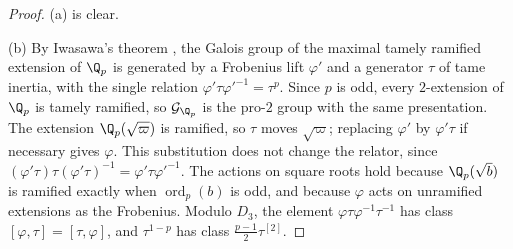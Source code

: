 \begin{proof}
(a) is clear.

(b) By Iwasawa's theorem \cite[Theorem~7.5.3]{NeukirchSchmidtWingberg2008},
the Galois group of the maximal tamely ramified extension of $\Q_p$ is
generated by a Frobenius lift $\varphi'$ and a generator $\tau$ of tame
inertia, with the single relation $\varphi'\tau\varphi'^{-1}=\tau^p$. Since
$p$ is odd,
every $2$-extension of $\Q_p$ is tamely ramified, so $\mathcal G_{\Q_p}$ is
the pro-$2$ group with the same presentation. The extension
$\Q_p(\sqrt\varpi)$ is ramified, so $\tau$ moves $\sqrt\varpi$; replacing
$\varphi'$ by $\varphi'\tau$ if necessary gives $\varphi$. This substitution
does not change the relator, since
$(\varphi'\tau)\tau(\varphi'\tau)^{-1}=\varphi'\tau\varphi'^{-1}$.
The actions on square roots hold because $\Q_p(\sqrt b)$ is ramified exactly
when $\operatorname{ord}_p(b)$ is odd, and because $\varphi$ acts on unramified extensions as
the Frobenius. Modulo $D_3$, the element $\varphi\tau\varphi^{-1}\tau^{-1}$
has class $[\varphi,\tau]=[\tau,\varphi]$, and $\tau^{1-p}$ has class
$\frac{p-1}2\tau^{[2]}$.


\end{proof}
